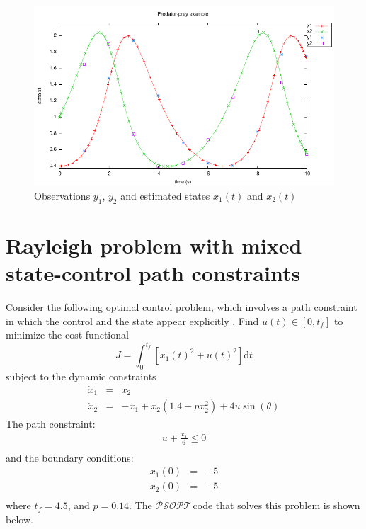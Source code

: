 \documentclass[a4paper,11pt]{report}    %
\newcommand{\psopt}{$\mathcal{PSOPT}$\,}  %
\begin{document}
\begin{figure}
  \centering 
  \includegraphics{../examples/predator/x1x2.pdf}
  \caption{Observations $y_1$, $y_2$ and estimated states $x_1(t)$ and $x_2(t)$}
 \label{fig:pred_x1x2}
\end{figure}







\section{Rayleigh problem with mixed state-control path constraints}

Consider the following optimal control problem, which involves a path constraint in which
the control and the state appear explicitly  \cite{Betts:10}.  
Find  $u(t) \in [0, t_f]$ 
to minimize the cost functional
\begin{equation}
  J = \int_{0}^{t_f} \left[  x_1(t)^2 + u(t)^2  \right] \mathrm{d}t
\end{equation}
subject to the dynamic constraints
\begin{equation}
  \begin{array}{lcl}
   \dot x_1 &=& x_2 \\
   \dot x_2 &=& -x_1 + x_2(1.4-p x_2^2) + 4 u \sin (\theta) 
  \end{array}
\end{equation}
The path constraint:
\begin{equation}
\begin{aligned}
  u + \frac{x_1}{6}  \le 0 \\
\end{aligned}
\end{equation}
and the boundary conditions:
 \begin{equation}
  \begin{array}{lcl}
   x_1(0) &=&  -5 \\
   x_2(0) &=&  -5 \\
  \end{array}
\end{equation}
where $t_f=4.5$, and $p=0.14$. The
\psopt code that solves this problem is shown below.  
\end{document}
